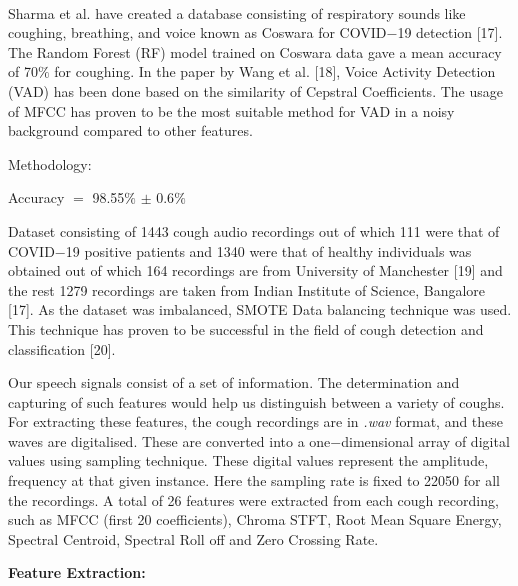\documentclass[11pt]{article}
\begin{document}
\textcolor[HTML]{0E101A}{ }

\textcolor[HTML]{0E101A}{Sharma et al. have created a database consisting of respiratory sounds like coughing, breathing, and voice known as Coswara for COVID$-$19 detection [17]. The Random Forest (RF) model trained on Coswara data gave a mean accuracy of 70$\%$ for coughing. In the paper by Wang et al. [18], Voice Activity Detection (VAD) has been done based on the similarity of Cepstral Coefficients. The usage of MFCC has proven to be the most suitable method for VAD in a noisy background compared to other features.}

\vspace{1\baselineskip}
{\LARGE Methodology:}

\vspace{1\baselineskip}
Accuracy $=$ 98.55$\%$ $\pm$ 0.6$\%$

Dataset consisting of 1443 cough audio recordings out of which 111 were that of COVID$-$19 positive patients and 1340 were that of healthy individuals was obtained out of which 164 recordings are from University of Manchester [19] and the rest 1279 recordings are taken from Indian Institute of Science, Bangalore [17]. As the dataset was imbalanced, SMOTE Data balancing technique was used. This technique has proven to be successful in the field of cough detection and classification [20]. 

\vspace{1\baselineskip}
Our speech signals consist of a set of information. The determination and capturing of such features would help us distinguish between a variety of coughs. For extracting these features, the cough recordings are in \textit{.wav} format, and these waves are digitalised. These are converted into a one$-$dimensional array of digital values using sampling technique. These digital values represent the amplitude, frequency at that given instance. Here the sampling rate is fixed to 22050 for all the recordings. A total of 26 features were extracted from each cough recording, such as MFCC (first 20 coefficients), Chroma STFT, Root Mean Square Energy, Spectral Centroid, Spectral Roll off and Zero Crossing Rate.

\vspace{1\baselineskip}
{\Large \textbf{Feature Extraction}{\large \textbf{:}}}
\end{document}
